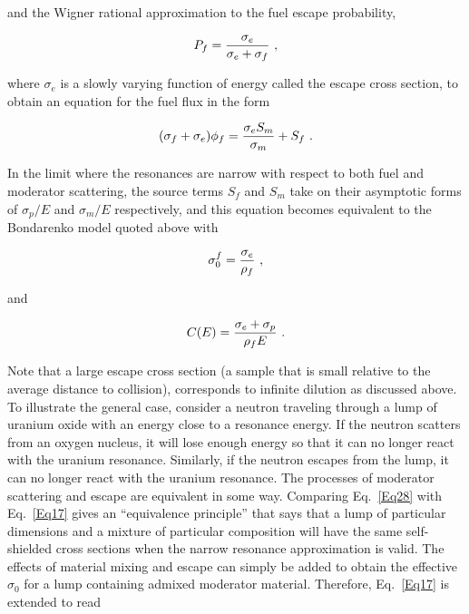 \noindent
and the Wigner rational approximation
to the fuel escape probability,

  \begin{equation}
    P_f={{\sigma_e}\over{\sigma_e+\sigma_f}}\,\,,
  \end{equation}

\noindent
where $\sigma_e$ is a slowly varying function of energy called the escape
cross section, to obtain an equation for the
fuel flux in the form

  \begin{equation}
    (\sigma_f+\sigma_e)\phi_f={{\sigma_e S_m}\over \sigma_m} +S_f \,\,.
  \label{Eq27}
  \end{equation}

\noindent
In the limit where the resonances are narrow with respect to both fuel
and moderator scattering, the source terms $S_f$ and $S_m$ take on their
asymptotic forms of $\sigma_p/E$ and $\sigma_m/E$ respectively, and this
equation becomes equivalent to the Bondarenko model quoted above with

  \begin{equation}
    \sigma_0^f={\sigma_e \over \rho_f}\,\,,
  \label{Eq28}
  \end{equation}

\noindent
and

  \begin{equation}
    C(E)={{\sigma_e+\sigma_p}\over{\rho_f E}}\,\,.
  \end{equation}

\noindent
Note that a large escape cross section (a sample that is small relative
to the average distance to collision), corresponds to infinite dilution
as discussed above.  To illustrate the general case, consider a neutron
traveling through a lump of uranium oxide with an energy close to a
resonance energy.  If the neutron scatters from an oxygen nucleus, it
will lose enough energy so that it can no longer react with the uranium
resonance.  Similarly, if the neutron escapes from the lump, it can no
longer react with the uranium resonance.  The processes of moderator
scattering and escape are equivalent in some way.  Comparing
Eq.~\ref{Eq28} with Eq.~\ref{Eq17} gives an
 ``equivalence principle''
that says that a lump of particular dimensions and a mixture of
particular composition will have the same self-shielded cross sections
when the narrow resonance approximation is valid.  The effects of
material mixing and escape can simply be added to obtain the effective
$\sigma_0$ for a lump containing admixed moderator material.  Therefore,
Eq.~\ref{Eq17} is extended to read

